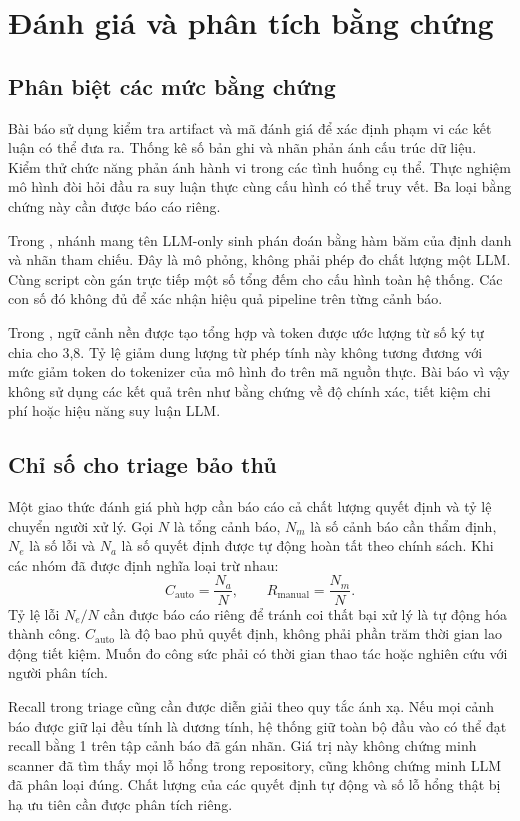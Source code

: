\documentclass[11pt,a4paper]{article}
\begin{document}
\section{Đánh giá và phân tích bằng chứng}
\subsection{Phân biệt các mức bằng chứng}
Bài báo sử dụng kiểm tra artifact và mã đánh giá để xác định phạm vi các kết luận có thể đưa ra. Thống kê số bản ghi và nhãn phản ánh cấu trúc dữ liệu. Kiểm thử chức năng phản ánh hành vi trong các tình huống cụ thể. Thực nghiệm mô hình đòi hỏi đầu ra suy luận thực cùng cấu hình có thể truy vết. Ba loại bằng chứng này cần được báo cáo riêng.

Trong , nhánh mang tên LLM-only sinh phán đoán bằng hàm băm của định danh và nhãn tham chiếu. Đây là mô phỏng, không phải phép đo chất lượng một LLM. Cùng script còn gán trực tiếp một số tổng đếm cho cấu hình toàn hệ thống. Các con số đó không đủ để xác nhận hiệu quả pipeline trên từng cảnh báo.

Trong , ngữ cảnh nền được tạo tổng hợp và token được ước lượng từ số ký tự chia cho 3,8. Tỷ lệ giảm dung lượng từ phép tính này không tương đương với mức giảm token do tokenizer của mô hình đo trên mã nguồn thực. Bài báo vì vậy không sử dụng các kết quả trên như bằng chứng về độ chính xác, tiết kiệm chi phí hoặc hiệu năng suy luận LLM.

\subsection{Chỉ số cho triage bảo thủ}
Một giao thức đánh giá phù hợp cần báo cáo cả chất lượng quyết định và tỷ lệ chuyển người xử lý. Gọi $N$ là tổng cảnh báo, $N_m$ là số cảnh báo cần thẩm định, $N_e$ là số lỗi và $N_a$ là số quyết định được tự động hoàn tất theo chính sách. Khi các nhóm đã được định nghĩa loại trừ nhau:
\begin{equation}
 C_{\mathrm{auto}}=\frac{N_a}{N},\qquad
 R_{\mathrm{manual}}=\frac{N_m}{N}.
\end{equation}
Tỷ lệ lỗi $N_e/N$ cần được báo cáo riêng để tránh coi thất bại xử lý là tự động hóa thành công. $C_{\mathrm{auto}}$ là độ bao phủ quyết định, không phải phần trăm thời gian lao động tiết kiệm. Muốn đo công sức phải có thời gian thao tác hoặc nghiên cứu với người phân tích.

Recall trong triage cũng cần được diễn giải theo quy tắc ánh xạ. Nếu mọi cảnh báo được giữ lại đều tính là dương tính, hệ thống giữ toàn bộ đầu vào có thể đạt recall bằng 1 trên tập cảnh báo đã gán nhãn. Giá trị này không chứng minh scanner đã tìm thấy mọi lỗ hổng trong repository, cũng không chứng minh LLM đã phân loại đúng. Chất lượng của các quyết định tự động và số lỗ hổng thật bị hạ ưu tiên cần được phân tích riêng.
\end{document}
